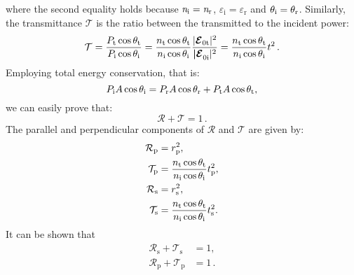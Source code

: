 where the second equality holds because $\textit{n}_{\textrm{i}}= \textit{n}_{\textrm{r}}$, $\varepsilon_{\textrm{i}} = \varepsilon_{\textrm{r}}$ and $\theta_{\textrm{i}} = \theta_{\textrm{r}}$.
Similarly, the transmittance $\mathcal{T}$ is the ratio between the transmitted to the incident power:
\begin{equation}\label{transmittance}
\mathcal{T} = \frac{P_\textrm{t} \cos\theta_\textrm{t}}{P_\textrm{i}\cos\theta_\textrm{i}} = \frac{n_\textrm{t} \cos\theta_\textrm{t}}{n_\textrm{i} \cos\theta_\textrm{i}}\frac{|\boldsymbol{\mathcal{E}}_{0 \textrm{t}}|^2}{\boldsymbol{|\mathcal{E}}_{0 \textrm{i}}|^2} = \frac{n_\textrm{t} \cos\theta_\textrm{t}}{n_\textrm{i} \cos\theta_\textrm{i}} t^2\,.
\end{equation}
Employing total energy conservation, that is:
\begin{equation}
P_\textrm{i} A\cos\theta_\textrm{i} = P_\textrm{r} A\cos\theta_\textrm{r}+P_\textrm{t} A\cos\theta_\textrm{t},
\end{equation}
we can easily prove that:
\begin{equation}
\mathcal{R}+\mathcal{T}=1\,.
\end{equation}
 The parallel and perpendicular components of $\mathcal{R}$ and $\mathcal{T}$ are given by:
\begin{equation}\label{Fresnel_pands}
\begin{split}
\mathcal{R}_\textrm{p}& =  {r_\textrm{p}^2},\\
\mathcal{T}_\textrm{p} &=  \frac{n_\textrm{t} \cos\theta_\textrm{t}}{n_\textrm{i} \cos\theta_\textrm{i}}t_\textrm{p}^2,\\
\mathcal{R}_\textrm{s} &=  r_\textrm{s}^2,\\
\mathcal{T}_\textrm{s} &= \frac{n_\textrm{t} \cos\theta_\textrm{t}}{n_\textrm{i} \cos\theta_\textrm{i}}t_\textrm{s}^2.\\
\end{split}
\end{equation}
It can be shown that 
\begin{equation}
\begin{split}
\mathcal{R}_\textrm{s}+\mathcal{T}_\textrm{s} &= 1,\\
\mathcal{R}_\textrm{p}+\mathcal{T}_\textrm{p} &=1\,.
\end{split}
\end{equation}
